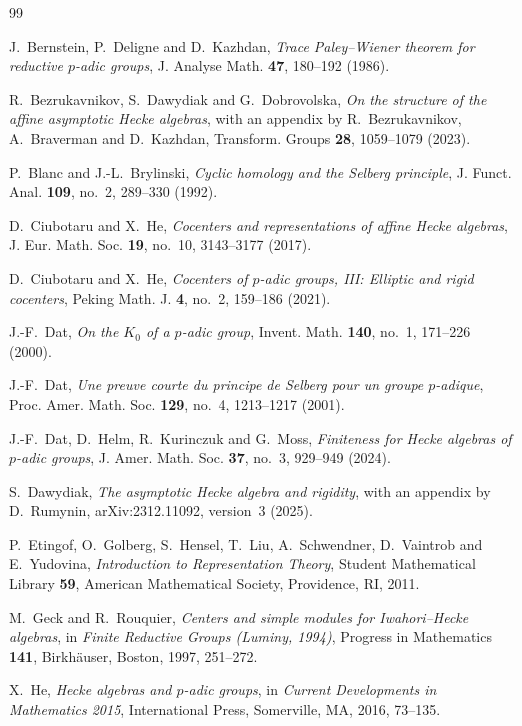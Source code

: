 \documentclass[11pt,letterpaper]{amsart}
\theoremstyle{definition}
\numberwithin{equation}{section}
\numberwithin{theorem}{section}
\begin{document}
\begin{thebibliography}{99}

 J.~Bernstein, P.~Deligne and D.~Kazhdan,
\emph{Trace Paley--Wiener theorem for reductive $p$-adic groups},
J. Analyse Math. \textbf{47}, 180--192 (1986).

R.~Bezrukavnikov, S.~Dawydiak and G.~Dobrovolska,
\emph{On the structure of the affine asymptotic Hecke algebras},
with an appendix by R.~Bezrukavnikov, A.~Braverman and D.~Kazhdan,
Transform. Groups \textbf{28}, 1059--1079 (2023).

P.~Blanc and J.-L.~Brylinski,
\emph{Cyclic homology and the Selberg principle},
J. Funct. Anal. \textbf{109}, no.~2, 289--330 (1992).

 D.~Ciubotaru and X.~He,
\emph{Cocenters and representations of affine Hecke algebras},
J. Eur. Math. Soc. \textbf{19}, no.~10, 3143--3177 (2017).

 D.~Ciubotaru and X.~He,
\emph{Cocenters of $p$-adic groups, III: Elliptic and rigid cocenters},
Peking Math. J. \textbf{4}, no.~2, 159--186 (2021).

 J.-F.~Dat,
\emph{On the $K_0$ of a $p$-adic group},
Invent. Math. \textbf{140}, no.~1, 171--226 (2000).

J.-F.~Dat,
\emph{Une preuve courte du principe de Selberg pour un groupe $p$-adique},
Proc. Amer. Math. Soc. \textbf{129}, no.~4,
1213--1217 (2001).

 J.-F.~Dat, D.~Helm, R.~Kurinczuk and G.~Moss,
\emph{Finiteness for Hecke algebras of $p$-adic groups},
J. Amer. Math. Soc. \textbf{37}, no.~3, 929--949 (2024).

 S.~Dawydiak, \emph{The asymptotic Hecke algebra and rigidity}, with an appendix by D.~Rumynin, arXiv:2312.11092, version~3 (2025).

P.~Etingof, O.~Golberg, S.~Hensel, T.~Liu,
A.~Schwendner, D.~Vaintrob and E.~Yudovina,
\emph{Introduction to Representation Theory},
Student Mathematical Library \textbf{59},
American Mathematical Society, Providence, RI, 2011.

 M.~Geck and R.~Rouquier,
\emph{Centers and simple modules for Iwahori--Hecke algebras}, in \emph{Finite Reductive Groups (Luminy, 1994)},
Progress in Mathematics \textbf{141},
Birkh\"auser, Boston, 1997, 251--272.

 X.~He,
\emph{Hecke algebras and $p$-adic groups},
in \emph{Current Developments in Mathematics 2015},
International Press, Somerville, MA, 2016, 73--135.


\end{thebibliography}
\end{document}
